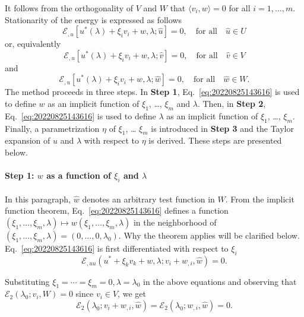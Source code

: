 \documentclass[12pt, final]{scrartcl}
\theoremstyle{definition}
\newcommand{\E}{\mathcal E}
\begin{document}
It follows from the orthogonality of $V$ and $W$ that $〈v_i, w〉 = 0$ for
all $i=1, \ldots, m$. Stationarity of the energy is expressed as follows
\begin{equation}
  \E_{,u}[u^\ast(\lambda) + ξ_i v_i + w, \lambda; \hat{u}] = 0, \quad \text{for all} \quad \hat{u} \in U
\end{equation}
or, equivalently
\begin{equation}
  \label{eq:20220901120544}
  \E_{,u}[u^\ast(\lambda) + ξ_i v_i + w, \lambda; \hat{v}] = 0, \quad \text{for all} \quad \hat{v} \in V
\end{equation}
and
\begin{equation}
  \label{eq:20220825143616}
  \E_{,u}[u^\ast(\lambda) + ξ_i v_i + w, \lambda; \hat{w}] = 0, \quad \text{for all} \quad \hat{w} \in W.
\end{equation}
The method proceeds in three steps. In \textbf{Step 1},
Eq.~\eqref{eq:20220825143616} is used to define $w$ as an implicit function of
$ξ_1$, \dots, $ξ_m$ and $\lambda$. Then, in \textbf{Step 2},
Eq.~\eqref{eq:20220825143616} is used to define $\lambda$ as an implicit function of
$ξ_1$, \dots, $ξ_m$. Finally, a parametrization $η$ of $ξ_1$, \dots
$ξ_m$ is introduced in \textbf{Step 3} and the Taylor expansion of $u$ and
$\lambda$ with respect to $η$ is derived. These steps are presented below.

\paragraph{Step 1: $w$ as a function of $ξ_i$ and $\lambda$} In this paragraph,
$\hat{w}$ denotes an arbitrary test function in $W$. From the implicit
function theorem, Eq.~\eqref{eq:20220825143616} defines a function
$(ξ_1, \ldots, ξ_m, \lambda) \mapsto w(ξ_1, \ldots, ξ_m, \lambda)$ in the neighborhood of
$(ξ_1, \ldots, ξ_m, \lambda) = (0, \ldots, 0, \lambda_0)$. Why the theorem applies will be
clarified below. Eq.~\eqref{eq:20220825143616} is first differentiated with respect to
$ξ_i$
\begin{equation}
  \label{eq:20220826140926}
  \E_{,uu}(u^\ast + ξ_k v_k + w, \lambda; v_i + w_{,i}, \hat{w}) = 0.
\end{equation}

Substituting $ξ_1 = \cdots = ξ_m = 0, \lambda = \lambda_0$ in the above equations and
observing that $\E_2(\lambda_0; v_i, W) = 0$ since $v_i \in V$, we get
\begin{equation}
\label{eq:20220825150219}
  \E_2(\lambda_0; v_i + w_{,i}, \hat{w}) = \E_2(\lambda_0; w_{,i}, \hat{w}) = 0.
\end{equation}
\end{document}
